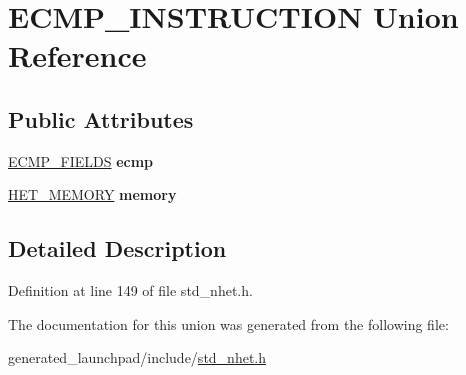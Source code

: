 \hypertarget{unionECMP__INSTRUCTION}{}\section{E\+C\+M\+P\+\_\+\+I\+N\+S\+T\+R\+U\+C\+T\+I\+ON Union Reference}
\label{unionECMP__INSTRUCTION}
\subsection*{Public Attributes}
\begin{DoxyCompactItemize}
\item 
\mbox{\label{unionECMP__INSTRUCTION_a112817a8eb19ea0e525ae4e36a8e7157}} 
\mbox{\hyperlink{structecmp__format}{E\+C\+M\+P\+\_\+\+F\+I\+E\+L\+DS}} {\bfseries ecmp}
\item 
\mbox{\label{unionECMP__INSTRUCTION_a4dbffe9f8a710e439591344f3eb57459}} 
\mbox{\hyperlink{structmemory__format}{H\+E\+T\+\_\+\+M\+E\+M\+O\+RY}} {\bfseries memory}
\end{DoxyCompactItemize}


\subsection{Detailed Description}


Definition at line 149 of file std\+\_\+nhet.\+h.



The documentation for this union was generated from the following file\+:\begin{DoxyCompactItemize}
\item 
generated\+\_\+launchpad/include/\mbox{\hyperlink{std__nhet_8h}{std\+\_\+nhet.\+h}}\end{DoxyCompactItemize}
